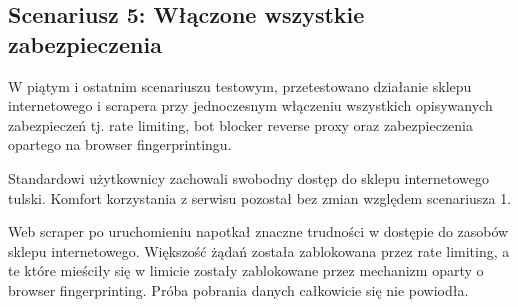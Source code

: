 \subsection{Scenariusz 5: Włączone wszystkie zabezpieczenia}\label{subsec:scenariusz-5:-waczone-wszystkie-zapezpieczenia}

W piątym i ostatnim scenariuszu testowym, przetestowano działanie sklepu internetowego i scrapera przy jednoczesnym włączeniu wszystkich opisywanych zabezpieczeń tj. rate limiting, bot blocker reverse proxy oraz zabezpieczenia opartego na browser fingerprintingu.

Standardowi użytkownicy zachowali swobodny dostęp do sklepu internetowego tulski.
Komfort korzystania z serwisu pozostał bez zmian względem scenariusza 1.

Web scraper po uruchomieniu napotkał znaczne trudności w dostępie do zasobów sklepu internetowego.
Większość żądań została zablokowana przez rate limiting, a te które mieściły się w limicie zostały zablokowane przez mechanizm oparty o browser fingerprinting.
Próba pobrania danych całkowicie się nie powiodła.